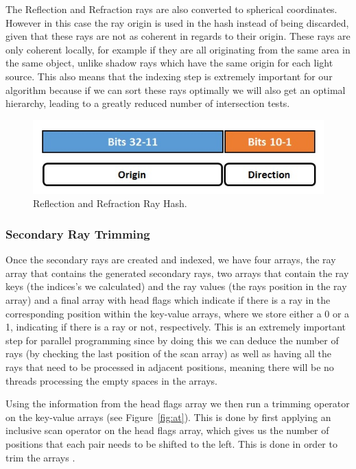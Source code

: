 The Reflection and Refraction rays are also converted to spherical coordinates. However in this case the ray origin is used in the hash instead of being discarded, given that these rays are not as coherent in regards to their origin. These rays are only coherent locally, for example if they are all originating from the same area in the same object, unlike shadow rays which have the same origin for each light source. This also means that the indexing step is extremely important for our algorithm because if we can sort these rays optimally we will also get an optimal hierarchy, leading to a greatly reduced number of intersection tests.

\begin{figure}[!htb]
    \centering
    \includegraphics[scale=0.85]{Images/Reflection_Hash}
    \caption{\label{fig:rrh}Reflection and Refraction Ray Hash.}
\end{figure}

\subsubsection{Secondary Ray Trimming}

Once the secondary rays are created and indexed, we have four arrays, the ray array that contains the generated secondary rays, two arrays that contain the ray keys (the indices's we calculated) and the ray values (the rays position in the ray array) and a final array with head flags which indicate if there is a ray in the corresponding position within the key-value arrays, where we store either a 0 or a 1, indicating if there is a ray or not, respectively. This is an extremely important step for parallel programming since by doing this we can deduce the number of rays (by checking the last position of the scan array) as well as having all the rays that need to be processed in adjacent positions, meaning there will be no threads processing the empty spaces in the arrays.

\medskip

Using the information from the head flags array we then run a trimming operator on the key-value arrays (see Figure~\ref{fig:at}). This is done by first applying an inclusive scan operator \cite{Merrill09} on the head flags array, which gives us the number of positions that each pair needs to be shifted to the left. This is done in order to trim the arrays \cite{GPUGems2}. 


